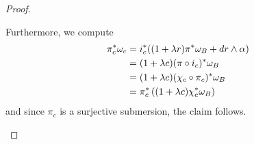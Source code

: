 \documentclass[10pt,a4paper]{amsart}
\renewcommand{\dd}{\textup{d}}
\begin{document}
\begin{proof}
\begin{enumerate}
    Furthermore, we compute
    \begin{align*}
        \pi_c^*\omega_c &= i_c^*((1+\lambda r)\pi^*\omega_B+\dd r\wedge\alpha) \\
        &= (1+\lambda c)(\pi\circ i_c)^*\omega_B \\
        &= (1+\lambda c)(\chi_c \circ \pi_c)^*\omega_B \\
        &= \pi_c^*\left( (1+\lambda c)\chi_c^*\omega_B\right)
    \end{align*}
    and since $\pi_c$ is a surjective submersion, the claim follows. \qedhere
    \end{enumerate}
\end{proof}
\end{document}

